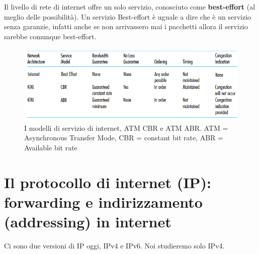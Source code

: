 \documentclass[11pt,a4paper]{book}
\begin{document}
Il livello di rete di internet offre un solo servizio, conosciuto come \textbf{best-effort} (al meglio delle possibilità). Un servizio Best-effort è uguale a dire che è un servizio senza garanzie, infatti anche se non arrivassero mai i pacchetti allora il servizio sarebbe comunque best-effort.
\begin{figure}
	\includegraphics[scale=0.6]{img/051.png}
	\caption{I modelli di servizio di internet, ATM CBR e ATM ABR. ATM = Asynchronous Transfer Mode, CBR = constant bit rate, ABR = Available bit rate}
\end{figure}

\section{Il protocollo di internet (IP): forwarding e indirizzamento (addressing) in internet}
Ci sono due versioni di IP oggi, IPv4 e IPv6. Noi studieremo solo IPv4.
\end{document}
